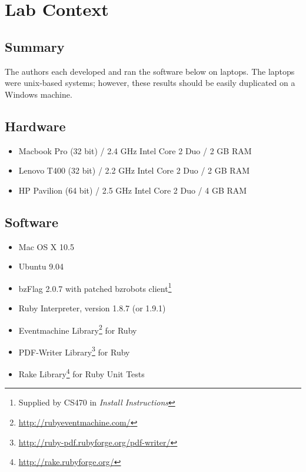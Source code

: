 \chapter{Lab Context}\label{chap:context}
\section{Summary}
The authors each developed and ran the software below on laptops.  The laptops were unix-based systems; however, these results should be easily duplicated on a Windows machine.

\section{Hardware}
\begin{itemize}
    \item Macbook Pro (32 bit) / 2.4 GHz Intel Core 2 Duo / 2 GB RAM
    \item Lenovo T400 (32 bit) / 2.2 GHz Intel Core 2 Duo / 2 GB RAM
    \item HP Pavilion (64 bit) / 2.5 GHz Intel Core 2 Duo / 4 GB RAM
\end{itemize}

\section{Software}
\begin{itemize}
    \item Mac OS X 10.5
    \item Ubuntu 9.04
    \item bzFlag 2.0.7 with patched bzrobots client\footnote{Supplied by CS470 in \textsl{Install Instructions}}
    \item Ruby Interpreter, version 1.8.7 (or 1.9.1)
    \item Eventmachine Library\footnote{\url{http://rubyeventmachine.com/}} for Ruby
    \item PDF-Writer Library\footnote{\url{http://ruby-pdf.rubyforge.org/pdf-writer/}} for Ruby
    \item Rake Library\footnote{\url{http://rake.rubyforge.org/}} for Ruby Unit Tests
\end{itemize}
